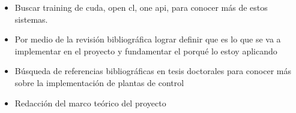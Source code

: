 \documentclass{article}
\begin{document}
    
\begin{itemize}
    \item Buscar training de cuda, open cl, one api, para conocer más de estos sistemas.
    \item Por medio de la revisión bibliográfica lograr definir que es lo que se va a implementar en el proyecto y fundamentar el porqué lo estoy aplicando
    \item Búsqueda de referencias bibliográficas en tesis doctorales para conocer más sobre la implementación de plantas de control
    \item Redacción del marco teórico del proyecto
\end{itemize}
    
\end{document}
